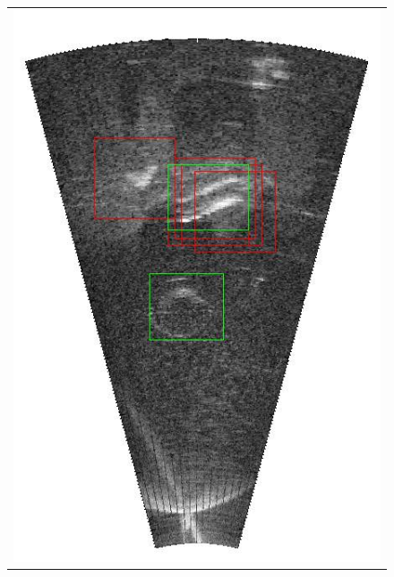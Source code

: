 \begin{figure}[!p]
{\begin{tabular}[b]{c}
		\includegraphics[height=0.22\textheight]{chapters/images/proposals/errors/2016-02-11_070611-frame03883-proposals.jpg}
        \end{tabular}        
	}
	

\end{figure}
